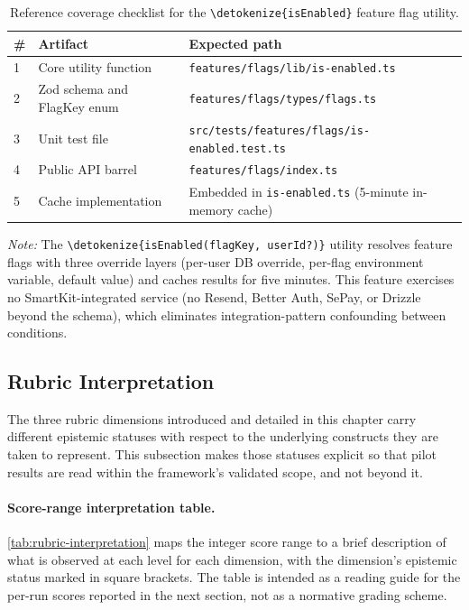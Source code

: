 \documentclass[12pt,a4paper]{report}
\newcommand{\code}[1]{\texttt{\nolinkurl{\detokenize{#1}}}}
\DeclareRobustCommand{\filename}[1]{\bgroup\urlstyle{tt}\nolinkurl{#1}\egroup}
\begin{document}
\begin{table}[ht]
\centering
\footnotesize
\renewcommand{\arraystretch}{1.25}
\caption{Reference coverage checklist for the \code{isEnabled} feature flag utility.}
\label{tbl:coverage-checklist}
\begin{tabular}{@{}p{0.7cm}p{3.3cm}>{\raggedright\arraybackslash}p{9cm}@{}}
\toprule
\# & Artifact & Expected path \\
\midrule
1 & Core utility function & \filename{features/flags/lib/is-enabled.ts} \\
2 & Zod schema and FlagKey enum & \filename{features/flags/types/flags.ts} \\
3 & Unit test file & \filename{src/tests/features/flags/is-enabled.test.ts} \\
4 & Public API barrel & \filename{features/flags/index.ts} \\
5 & Cache implementation & Embedded in \filename{is-enabled.ts} (5-minute in-memory cache) \\
\bottomrule
\end{tabular}

\vspace{2pt}
\footnotesize\textit{Note:} The \code{isEnabled(flagKey, userId?)} utility resolves feature flags with three override layers (per-user DB override, per-flag environment variable, default value) and caches results for five minutes. This feature exercises no SmartKit-integrated service (no Resend, Better Auth, SePay, or Drizzle beyond the schema), which eliminates integration-pattern confounding between conditions.
\renewcommand{\arraystretch}{1}
\end{table}

\subsection{Rubric Interpretation}
\label{sec:rubric-interpretation}

The three rubric dimensions introduced and detailed in this chapter carry different epistemic statuses with respect to the underlying constructs they are taken to represent. This subsection makes those statuses explicit so that pilot results are read within the framework's validated scope, and not beyond it.

\paragraph{Score-range interpretation table.}
\autoref{tab:rubric-interpretation} maps the integer score range to a brief description of what is observed at each level for each dimension, with the dimension's epistemic status marked in square brackets. The table is intended as a reading guide for the per-run scores reported in the next section, not as a normative grading scheme.
\end{document}
